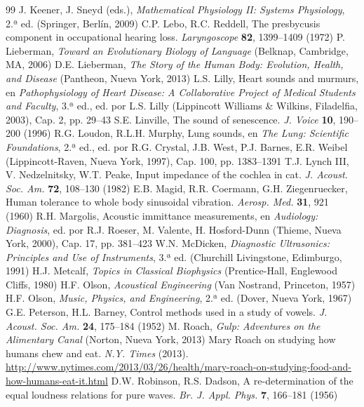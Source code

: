 \documentclass[12pt]{book}
\begin{document}
\begin{thebibliography}{99}
 J. Keener, J. Sneyd (eds.), \textit{Mathematical Physiology II: Systems Physiology}, 2.ª ed. (Springer, Berlín, 2009)
 C.P. Lebo, R.C. Reddell, The presbycusis component in occupational hearing loss. \textit{Laryngoscope} \textbf{82}, 1399--1409 (1972)
 P. Lieberman, \textit{Toward an Evolutionary Biology of Language} (Belknap, Cambridge, MA, 2006)
 D.E. Lieberman, \textit{The Story of the Human Body: Evolution, Health, and Disease} (Pantheon, Nueva York, 2013)
 L.S. Lilly, Heart sounds and murmurs, en \textit{Pathophysiology of Heart Disease: A Collaborative Project of Medical Students and Faculty}, 3.ª ed., ed. por L.S. Lilly (Lippincott Williams \& Wilkins, Filadelfia, 2003), Cap. 2, pp. 29--43
 S.E. Linville, The sound of senescence. \textit{J. Voice} \textbf{10}, 190--200 (1996)
 R.G. Loudon, R.L.H. Murphy, Lung sounds, en \textit{The Lung: Scientific Foundations}, 2.ª ed., ed. por R.G. Crystal, J.B. West, P.J. Barnes, E.R. Weibel (Lippincott-Raven, Nueva York, 1997), Cap. 100, pp. 1383--1391
 T.J. Lynch III, V. Nedzelnitsky, W.T. Peake, Input impedance of the cochlea in cat. \textit{J. Acoust. Soc. Am.} \textbf{72}, 108--130 (1982)
 E.B. Magid, R.R. Coermann, G.H. Ziegenruecker, Human tolerance to whole body sinusoidal vibration. \textit{Aerosp. Med.} \textbf{31}, 921 (1960)
 R.H. Margolis, Acoustic immittance measurements, en \textit{Audiology: Diagnosis}, ed. por R.J. Roeser, M. Valente, H. Hosford-Dunn (Thieme, Nueva York, 2000), Cap. 17, pp. 381--423
 W.N. McDicken, \textit{Diagnostic Ultrasonics: Principles and Use of Instruments}, 3.ª ed. (Churchill Livingstone, Edimburgo, 1991)
 H.J. Metcalf, \textit{Topics in Classical Biophysics} (Prentice-Hall, Englewood Cliffs, 1980)
 H.F. Olson, \textit{Acoustical Engineering} (Van Nostrand, Princeton, 1957)
 H.F. Olson, \textit{Music, Physics, and Engineering}, 2.ª ed. (Dover, Nueva York, 1967)
 G.E. Peterson, H.L. Barney, Control methods used in a study of vowels. \textit{J. Acoust. Soc. Am.} \textbf{24}, 175--184 (1952)
 M. Roach, \textit{Gulp: Adventures on the Alimentary Canal} (Norton, Nueva York, 2013)
 Mary Roach on studying how humans chew and eat. \textit{N.Y. Times} (2013). \url{http://www.nytimes.com/2013/03/26/health/mary-roach-on-studying-food-and-how-humans-eat-it.html}
 D.W. Robinson, R.S. Dadson, A re-determination of the equal loudness relations for pure waves. \textit{Br. J. Appl. Phys.} \textbf{7}, 166--181 (1956)

\end{thebibliography}
\end{document}

